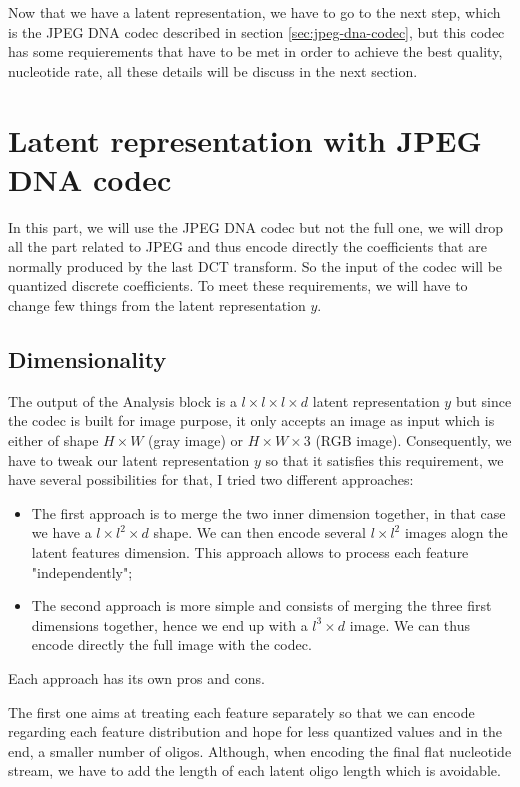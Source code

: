 Now that we have a latent representation, we have to go to the next step, which is the JPEG DNA codec described in section \ref{sec:jpeg-dna-codec}, but this codec has some requierements that have to be met in order to achieve the best quality, nucleotide rate, all these details will be discuss in the next section.

\section{Latent representation with JPEG DNA codec}

In this part, we will use the JPEG DNA codec but not the full one, we will drop all the part related to JPEG and thus encode directly the coefficients that are normally produced by the last DCT transform. So the input of the codec will be quantized discrete coefficients. To meet these requirements, we will have to change few things from the latent representation $y$.

\subsection{Dimensionality}

The output of the Analysis block is a $l \times l \times l \times d$ latent representation $y$ but since the codec is built for image purpose, it only accepts an image as input which is either of shape $H \times W$ (gray image) or $H \times W \times 3$ (RGB image). 
Consequently, we have to tweak our latent representation $y$ so that it satisfies this requirement, we have several possibilities for that, I tried two different approaches:

\begin{itemize}
    \item The first approach is to merge the two inner dimension together, in that case we have a $l \times l^2 \times d$ shape. We can then encode several $l \times l^2$ images alogn the latent features dimension. This approach allows to process each feature "independently";
    \item The second approach is more simple and consists of merging the three first dimensions together, hence we end up with a $l^3 \times d$ image. We can thus encode directly the full image with the codec.
\end{itemize}

Each approach has its own pros and cons. 

The first one aims at treating each feature separately so that we can encode regarding each feature distribution and hope for less quantized values and in the end, a smaller number of oligos. Although, when encoding the final flat nucleotide stream, we have to add the length of each latent oligo length which is avoidable.


